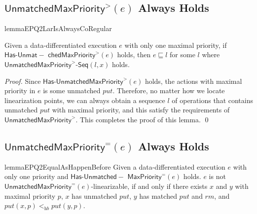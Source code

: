 \subsection{$\mathsf{UnmatchedMaxPriority}^{>}(e)$ Always Holds}
\label{subsec:appendix co-regular of EPQ2Lar}


\begin{restatable}{lemma}{EPQ2LarIsAlwaysCoRegular}
\label{lemma:EPQ2Lar is always co-regular}

Given a data-differentiated execution $e$ with only one maximal priority, if $\mathsf{Has\text{-}}\mathsf{Unmat-}$ $\mathsf{chedMaxPriority}^{>}(e)$ holds, then $e \sqsubseteq l$ for some $l$ where $\mathsf{UnmatchedMaxPriority}^{>}\mathsf{\text{-}Seq}(l,x)$ holds.
\end{restatable}

\begin {proof}
Since $\mathsf{Has\text{-}}\mathsf{UnmatchedMaxPriority}^{>}(e)$ holds, the actions with maximal priority in $e$ is some unmatched $\textit{put}$. Therefore, no matter how we locate linearization points, we can always obtain a sequence $l$ of operations that contains unmatched $\textit{put}$ with maximal priority, and this satisfy the requirements of $\mathsf{UnmatchedMaxPriority}^{>}$. This completes the proof of this lemma. \qed
\end {proof}




\subsection{$\mathsf{UnmatchedMaxPriority}^{=}(e)$ Always Holds}
\label{subsec:appendix co-regular of EPQ2Equal}

\begin{restatable}{lemma}{EPQ2EqualAsHappenBefore}
\label{lemma:EPQ2Equal as happen before}
Given a data-differentiated execution $e$ with only one priority and $\mathsf{Has\text{-}}\mathsf{Unmatched-}$ $\mathsf{MaxPriority}^{=}(e)$ holds. $e$ is not $\mathsf{UnmatchedMaxPriority}^{=}(e)$-linearizable, if and only if there exists $x$ and $y$ with maximal priority $p$, $x$ has unmatched $\textit{put}$, $y$ has matched $\textit{put}$ and $\textit{rm}$, and $\textit{put}(x,p) <_{\textit{hb}} \textit{put}(y,p)$.
\end{restatable}

